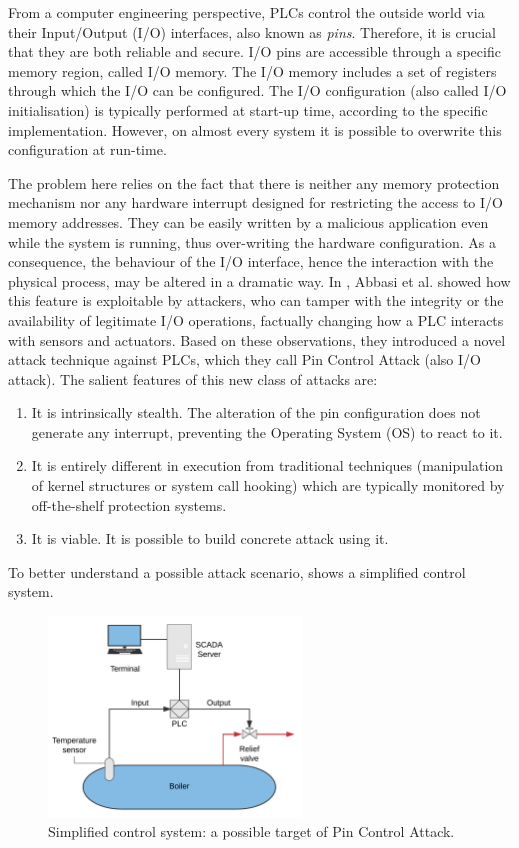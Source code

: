 From a computer engineering perspective, PLCs control the outside world via their Input/Output (I/O) interfaces, also known as \emph{pins}.
Therefore, it is crucial that they are both reliable and secure. I/O pins are accessible through a specific memory region, called I/O memory.
The I/O memory includes a set of registers through which the I/O can be configured. The I/O configuration (also called I/O initialisation) is typically performed at start-up time,
according to the specific implementation. However, on almost every system it is possible to overwrite this configuration at run-time.

The problem here relies on the fact that there is neither any memory protection mechanism nor any hardware interrupt designed for restricting the access to I/O memory addresses.
They can be easily written by a malicious application even while the system is running, thus over-writing the hardware configuration.
As a consequence, the behaviour of the I/O interface, hence the interaction with the physical process, may be altered in a dramatic way.
In \cite{ghostplc}, Abbasi et al. showed how this feature is exploitable by attackers, who can tamper with
the integrity or the availability of legitimate I/O operations, factually changing how a PLC interacts with sensors and actuators.
Based on these observations, they introduced a novel attack technique against PLCs, which they call Pin Control Attack (also I/O attack).
The salient features of this new class of attacks are:
\begin{enumerate}[itemsep=2pt,topsep=0pt]
	\item It is intrinsically stealth. The alteration of the pin configuration does not generate any interrupt, preventing the Operating System (OS) to react to it.
	\item It is entirely different in execution from traditional techniques (\eg manipulation of kernel structures or system call hooking) which are typically
		monitored by off-the-shelf protection systems.
	\item It is viable. It is possible to build concrete attack using it.
\end{enumerate}

To better understand a possible attack scenario,  shows a simplified control system.
\begin{figure}[h!]
\centerline{\includegraphics[width=0.6\textwidth]{res/control}}
\caption{Simplified control system: a possible target of Pin Control Attack.\label{fig:control}}
\end{figure}

